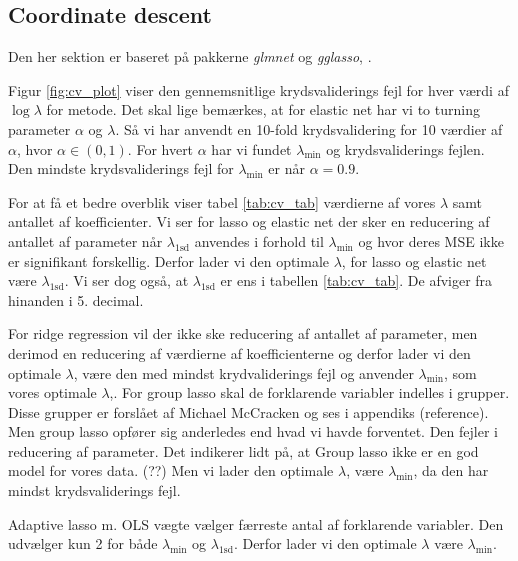 \subsection{Coordinate descent}
Den her sektion er baseret på pakkerne \textit{glmnet} og \textit{gglasso}, \citep{gglasso}.

Figur \ref{fig:cv_plot} viser den gennemsnitlige krydsvaliderings fejl for hver værdi af $\log \lambda$ for metode.
Det skal lige bemærkes, at for elastic net har vi to turning parameter $\alpha$ og $\lambda$. 
Så vi har anvendt en 10-fold krydsvalidering for 10 værdier af $\alpha$, hvor $\alpha \in (0,1)$. 
For hvert $\alpha$ har vi fundet $\lambda_{\min}$ og krydsvaliderings fejlen.  
Den mindste krydsvaliderings fejl for $\lambda_{\min}$ er når $\alpha =0.9$. 




For at få et bedre overblik viser tabel  \ref{tab:cv_tab} værdierne af vores $\lambda$ samt antallet af koefficienter. 
Vi ser for lasso og elastic net der sker en reducering af antallet af parameter når $\lambda_{1\text{sd}}$ anvendes i forhold til $\lambda_{\min}$ og hvor deres MSE ikke er signifikant forskellig.  
Derfor lader vi den optimale $\lambda$, for lasso og elastic net være $\lambda_{1\text{sd}}$.
Vi ser dog også, at $\lambda_{1\text{sd}}$ er ens i tabellen \ref{tab:cv_tab}. 
De afviger fra hinanden i 5. decimal.  

For ridge regression vil der ikke ske reducering af antallet af parameter, men derimod en reducering af værdierne af koefficienterne og derfor lader vi den optimale $\lambda$, være den med mindst krydvaliderings fejl og anvender $\lambda_{\min}$, som vores optimale $\lambda$,. 
%
For group lasso skal de forklarende variabler indelles i  grupper. 
Disse grupper er forslået af Michael McCracken og ses i appendiks (reference).
Men group lasso opfører sig anderledes end hvad vi havde forventet. 
Den fejler i reducering af parameter. 
Det indikerer lidt på, at Group lasso ikke er en god model for vores data. (??)
Men vi lader den optimale $\lambda$, være $\lambda_{\min}$, da den har mindst krydsvaliderings fejl. 

Adaptive lasso m. OLS vægte vælger færreste antal af forklarende variabler. 
Den udvælger kun 2 for både  $\lambda_{\min}$ og $\lambda_{1\text{sd}}$. 
Derfor lader vi den optimale $\lambda$ være $\lambda_{\min}$. 


